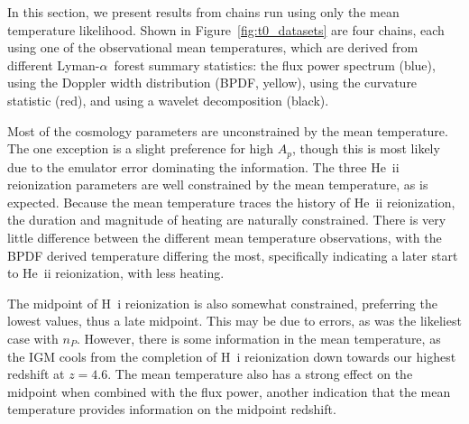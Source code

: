 \documentclass[a4paper,11pt]{article}
\newcommand{\lya}{Lyman-$\alpha$\ }
\begin{document}
In this section, we present results from chains run using only the mean temperature likelihood.
Shown in Figure~\ref{fig:t0_datasets} are four chains, each using one of the observational mean temperatures, which are derived from different \lya forest summary statistics: the flux power spectrum (blue), using the Doppler width distribution (BPDF, yellow), using the curvature statistic (red), and using a wavelet decomposition (black).

Most of the cosmology parameters are unconstrained by the mean temperature.
The one exception is a slight preference for high $A_p$, though this is most likely due to the emulator error dominating the information.
The three He~{\sc ii} reionization parameters are well constrained by the mean temperature, as is expected.
Because the mean temperature traces the history of He~{\sc ii} reionization, the duration and magnitude of heating are naturally constrained.
There is very little difference between the different mean temperature observations, with the BPDF derived temperature differing the most, specifically indicating a later start to He~{\sc ii} reionization, with less heating.

The midpoint of H~{\sc i} reionization is also somewhat constrained, preferring the lowest values, thus a late midpoint.
This may be due to errors, as was the likeliest case with $n_P$.
However, there is some information in the mean temperature, as the IGM cools from the completion of H~{\sc i} reionization down towards our highest redshift at $z=4.6$.
The mean temperature also has a strong effect on the midpoint when combined with the flux power, another indication that the mean temperature provides information on the midpoint redshift.
\end{document}

